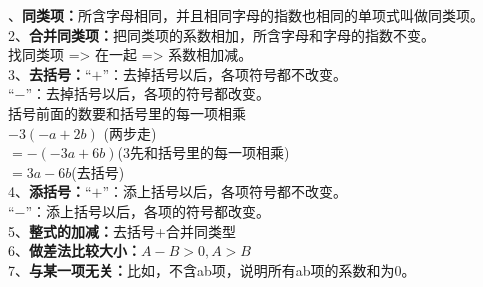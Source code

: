 \documentclass[fleqn,UTF8]{ctexart}                                       %
\title{}                                              %
\date{}                                                              %
\begin{document}
\hspace{5cm}{\Large \kaishu 整式的加减}                                 %

、\kaishu \textbf{同类项：}所含字母相同，并且相同字母的指数也相同的单项式叫做同类项。\\
2、\textbf{合并同类项：}把同类项的系数相加，所含字母和字母的指数不变。\\
 找同类项 => 在一起 => 系数相加减。\\
3、\textbf{去括号：}“$+$”：去掉括号以后，各项符号都不改变。\\
\phantom{3、去括号：}“$-$”：去掉括号以后，各项的符号都改变。\\
\phantom{3、去括号：} 括号前面的数要和括号里的每一项相乘\\
\phantom{3、去括号：=} $-3(-a+2b)$ (两步走)\\
\phantom{3、去括号：} $ =-(-3a+6b)$(3先和括号里的每一项相乘)\\
\phantom{3、去括号：} $ =3a-6b$(去括号)\\
4、\textbf{添括号：}“$+$”：添上括号以后，各项符号都不改变。\\
\phantom{3、去括号：}“$-$”：添上括号以后，各项的符号都改变。\\
5、\textbf{整式的加减：}去括号+合并同类型\\
6、\textbf{做差法比较大小：}$A-B>0,A>B$\\
7、\textbf{与某一项无关：}比如，不含ab项，说明所有ab项的系数和为0。\\
\newpage
\end{document}
